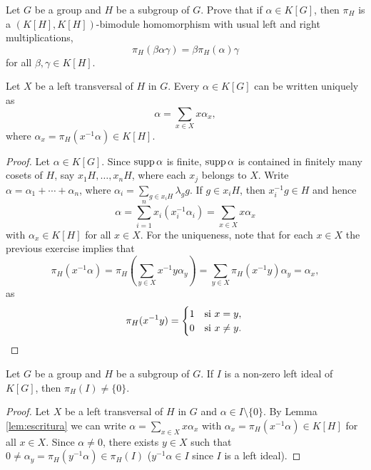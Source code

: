 \begin{exercise}
	Let $G$ be a group and $H$ be a subgroup of $G$. Prove that
	if $\alpha\in
	K[G]$, then $\pi_H$ is a $(K[H],K[H])$-bimodule homomorphism
	with usual left and right multiplications,
	\[
		\pi_H(\beta\alpha\gamma)=\beta\pi_H(\alpha)\gamma
	\]
	for all $\beta,\gamma\in K[H]$.
\end{exercise}


\begin{lemma}
	\label{lem:escritura}
	Let $X$ be a left transversal of $H$ in $G$. Every $\alpha\in K[G]$ can be written
	uniquely as 
	\[
	\alpha=\sum_{x\in X}x\alpha_x,
	\]
	where $\alpha_x=\pi_H(x^{-1}\alpha)\in K[H]$.
\end{lemma}

\begin{proof}
	Let $\alpha\in K[G]$. Since $\operatorname{supp}\alpha$ is finite, $\operatorname{supp}\alpha$ is contained 
    in finitely many cosets of $H$, say $x_1H,\dots,x_nH$, where each 
	$x_j$ belongs to $X$. Write $\alpha=\alpha_1+\cdots+\alpha_n$,
	where $\alpha_i=\sum_{g\in x_iH}\lambda_gg$. If $g\in x_iH$, then 
	$x_i^{-1}g\in H$ and hence 
	\[
		\alpha=\sum_{i=1}^n x_i(x_i^{-1}\alpha_i)=\sum_{x\in X}x\alpha_x
	\]
	with $\alpha_x\in K[H]$ for all $x\in X$. For the uniqueness, note that 
	for each  $x\in X$ the previous exercise implies that  
	\[
		\pi_H(x^{-1}\alpha)
		=\pi_H\left(\sum_{y\in X}x^{-1}y\alpha_y\right)
		=\sum_{y\in X}\pi_H(x^{-1}y)\alpha_y=\alpha_x, 
	\]
	as  
	\[
		\pi_H(x^{-1}y)=\begin{cases}
		1 & \text{si $x=y$},\\
		0 & \text{si $x\ne y$}.
	\end{cases}\qedhere 
	\]
\end{proof}

\begin{lemma}
	\label{lem:ideal_pi}
	Let $G$ be a group and $H$ be a subgroup of $G$. If $I$ is a non-zero 
	left ideal
	of $K[G]$, then  $\pi_H(I)\ne\{0\}$.
\end{lemma}

\begin{proof}
	Let $X$ be a left transversal of $H$ in $G$ and $\alpha\in I\setminus\{0\}$. By Lemma
	\ref{lem:escritura} we can write $\alpha=\sum_{x\in
	X}x\alpha_x$ with $\alpha_x=\pi_H(x^{-1}\alpha)\in K[H]$ for all $x\in X$.
	Since $\alpha\ne0$, there exists $y\in X$ such that $0\ne
	\alpha_y=\pi_H(y^{-1}\alpha)\in\pi_H(I)$ ($y^{-1}\alpha\in I$ since $I$ is 
    a left ideal).
\end{proof}

